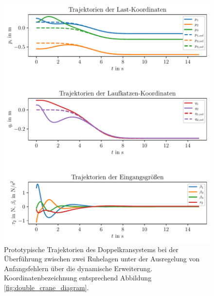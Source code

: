 \begin{figure}[H]
	\begin{center}
		\includegraphics[scale=1]{Pictures/dyn_controller_initial_error}
	\end{center}
	\caption[Trajektorien Ruhelagenüberführung mit Regelung über dynamische Erweiterung]
	{Prototypische Trajektorien des Doppelkransystems bei der Überführung zwischen zwei Ruhelagen unter der Ausregelung von Anfangsfehlern über die dynamische Erweiterung. Koordinatenbezeichnung entsprechend Abbildung \ref{fig:double_crane_diagram}.}
	\label{fig_dyn_controller_initial_error}
\end{figure}

